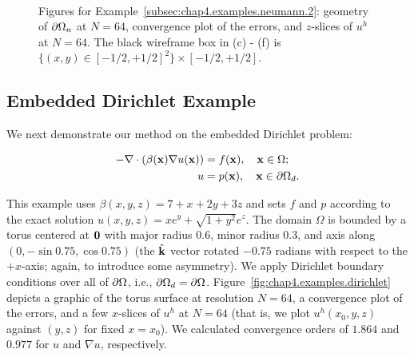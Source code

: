 \setlength{\figureheighti}{0.43\textwidth}
\setlength{\figurewidthii}{0.25\textwidth}
\begin{figure}[htbp]
\centering
{}
 \\
\caption{Figures for Example~\ref{subsec:chap4.examples.neumann.2}: geometry of $\partial\Omega_n$ at $N = 64$, convergence plot of the errors, and $z$-slices of $u^h$ at $N = 64$. The black wireframe box in (c) - (f) is $\{(x,y) \in [-1/2,+1/2]^2\} \times [-1/2,+1/2]$.}
\label{fig:chap4.examples.neumann.2}
\end{figure}

\subsection{Embedded Dirichlet Example} \label{subsec:chap4.example.dirichlet}

We next demonstrate our method on the embedded Dirichlet problem:

\begin{align*}
-\nabla \cdot \left( \beta(\mathbf{x}) \nabla u(\mathbf{x}) \right) & = f(\mathbf{x}), \quad \mathbf{x} \in \Omega; \\
u & = p(\mathbf{x}), \quad \mathbf{x} \in \partial\Omega_d.
\end{align*}

This example uses $\beta(x,y,z) = 7 + x + 2y + 3z$ and sets $f$ and $p$ according to the exact solution $u(x,y,z) = x e^y + \sqrt{1 + y^2} e^z$. The domain $\Omega$ is bounded by a torus centered at $\mathbf{0}$ with major radius $0.6$, minor radius $0.3$, and axis along $(0, -\sin 0.75, \cos 0.75)$ (the $\hat{\mathbf{k}}$ vector rotated $-0.75$ radians with respect to the $+x$-axis; again, to introduce some asymmetry). We apply Dirichlet boundary conditions over all of $\partial\Omega$, i.e., $\partial\Omega_d = \partial\Omega$. Figure~\ref{fig:chap4.examples.dirichlet} depicts a graphic of the torus surface at resolution $N = 64$, a convergence plot of the errors, and a few $x$-slices of $u^h$ at $N = 64$ (that is, we plot $u^h(x_0,y,z)$ against $(y,z)$ for fixed $x = x_0$). We calculated convergence orders of $1.864$ and $0.977$ for $u$ and $\nabla u$, respectively.

